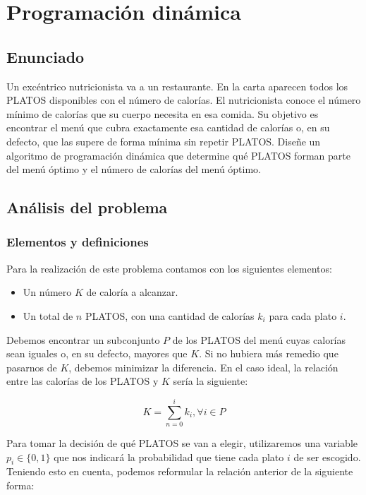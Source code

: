 \chapter{Programación dinámica}\label{programacion-dinamica}

\section{Enunciado}\label{pd-enunciado}

Un excéntrico nutricionista va a un restaurante.
En la carta aparecen todos los PLATOS disponibles con el número de calorías.
El nutricionista conoce el número mínimo de calorías que su cuerpo necesita en esa comida.
Su objetivo es encontrar el menú que cubra exactamente esa cantidad de calorías o, en su defecto, que las supere de forma mínima sin repetir PLATOS\@.
Diseñe un algoritmo de programación dinámica que determine qué PLATOS forman parte del menú óptimo y el número de calorías del menú óptimo.

\section{Análisis del problema}\label{pd-analisis}

\subsection{Elementos y definiciones}\label{pd-elementos-y-definiciones}

Para la realización de este problema contamos con los siguientes elementos:

\begin{itemize}
	\item Un número $K$ de caloría a alcanzar.
	\item Un total de $n$ PLATOS, con una cantidad de calorías $k_i$ para cada plato $i$.
\end{itemize}

Debemos encontrar un subconjunto $P$ de los PLATOS del menú cuyas calorías sean iguales o, en su defecto, mayores que $K$.
Si no hubiera más remedio que pasarnos de $K$, debemos minimizar la diferencia.
En el caso ideal, la relación entre las calorías de los PLATOS y $K$ sería la siguiente:

\[K=\sum_{n=0}^{i}k_i,\forall i\in P\]

Para tomar la decisión de qué PLATOS se van a elegir, utilizaremos una variable $p_i\in\{0,1\}$ que nos indicará la probabilidad que tiene cada plato $i$ de ser escogido.
Teniendo esto en cuenta, podemos reformular la relación anterior de la siguiente forma:


